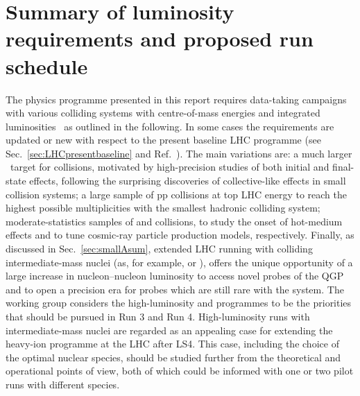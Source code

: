 \documentclass[../report.tex]{subfiles}
\begin{document}
\section{Summary of luminosity requirements and proposed run schedule}
\label{sec:schedule}

The physics programme presented in this report requires data-taking campaigns with various colliding systems with centre-of-mass energies and integrated luminosities \Lint\ as outlined in the following. In some cases the requirements are updated or new with respect to the present baseline LHC programme (see Sec.~\ref{sec:LHCpresentbaseline} and Ref.~\cite{Abelevetal:2014cna}). The main variations are: a much larger \Lint\ target for \pPb collisions, motivated by high-precision studies of both initial and final-state effects, following the surprising discoveries of collective-like effects in small collision systems; a large sample of pp collisions at top LHC energy to reach the highest possible multiplicities with the smallest hadronic colliding system; moderate-statistics samples of \OO and \pO collisions, to study the onset of hot-medium effects and to tune cosmic-ray particle production models, respectively. Finally, as discussed in Sec.~\ref{sec:smallAsum}, extended LHC running with colliding intermediate-mass nuclei (as, for example, \ArAr or \KrKr), offers the unique opportunity of a large increase in nucleon--nucleon luminosity to access novel probes of the QGP and to open a precision era for probes which are still rare with the \PbPb system. The working group considers the high-luminosity \PbPb and \pPb programmes to be the priorities that should be pursued in Run 3 and Run 4. High-luminosity runs with intermediate-mass nuclei are regarded as an appealing case for extending the heavy-ion programme at the LHC after LS4.
This case, including the choice of the optimal nuclear species, should be studied further from the theoretical and operational points of view, both of which could be informed with one or two pilot runs with different species. 
\end{document}
